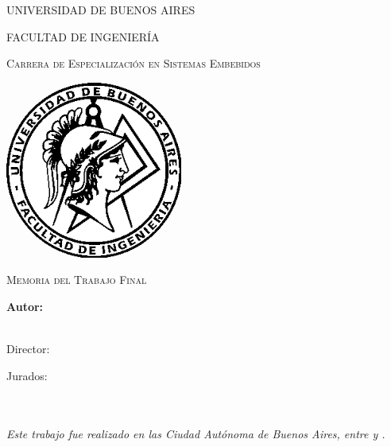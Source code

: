\documentclass[
11pt, %
spanish,
singlespacing, %
parskip, %
headsepline, %
]{MastersDoctoralThesis} %
\author{Ing. Federico Roux} %
\begin{document}
\frontmatter %

\pagestyle{plain} %


\begin{titlepage}
\begin{center}

{\scshape\LARGE UNIVERSIDAD DE BUENOS AIRES\par}\vspace{0.1cm} %
{\scshape\LARGE FACULTAD DE INGENIERÍA\par}\vspace{0.1cm} %
{\scshape\LARGE Carrera de Especialización en Sistemas Embebidos\par}\vspace{1cm} %

\includegraphics[width=.3\textwidth]{./Figures/logoFIUBA.png}
\vspace{1cm}

\textsc{\Large Memoria del Trabajo Final}\\[0.5cm] %

{\huge \bfseries \ttitle\par}\vspace{0.4cm} %

\vspace{1cm}
\LARGE\textbf{Autor:\\
\authorname}\\ %

\vspace{1cm}

\large
\vspace{10px}
{Director:} \\
{\supname} %
 
\vspace{1cm}
Jurados:\\
\jurunoname\\
\jurdosname\\
\jurtresname
 
\vfill
\textit{Este trabajo fue realizado en las Ciudad Autónoma de Buenos Aires, entre \fechaINICIOname \hspace{1px} y \fechaFINALname.}
\end{center}
\end{titlepage}
\end{document}

